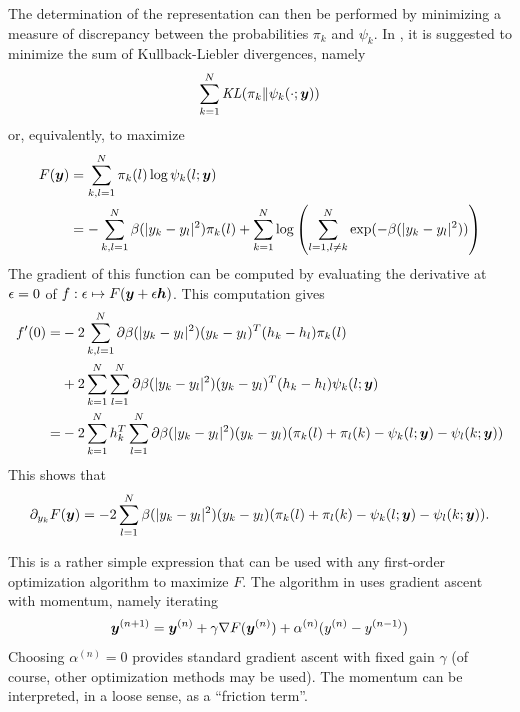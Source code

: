 
The determination of the representation can then be performed by minimizing a measure of discrepancy between the probabilities $\pi_k$ and $\psi_k$. In \citet{hinton2002stochastic}, it is suggested to minimize the sum of Kullback-Liebler divergences, namely
\[
\sum_{k=1}^N \mathit{KL}(\pi_k\|\psi_k(\cdot;{\bm{y}})) 
\]
or, equivalently, to maximize
\begin{align*}
F({\bm{y}}) &= \sum_{k,l=1}^N \pi_k(l) \log \psi_k(l ; {\bm{y}}) \\
&= - \sum_{k,l=1}^N \beta(|y_k-y_l|^2) \pi_k(l) + \sum_{k=1}^N \log \left(\sum_{l=1, l\neq k}^N \exp(-\beta(|y_k-y_l|^2))\right)
\end{align*}
The gradient of this function can be computed by evaluating the derivative at $\epsilon=0$ of $f: \epsilon \mapsto F( {\bm{y}}+\epsilon {\bm{h}})$. This computation gives
\begin{align*}
f'(0) =& -2 \sum_{k,l=1}^N \partial\beta(|y_k-y_l|^2) (y_k-y_l)^T(h_k-h_l) \pi_k(l) \\
&+ 2\sum_{k=1}^N \sum_{l=1}^N \partial \beta(|y_k-y_l|^2) (y_k-y_l)^T(h_k-h_l)\psi_k(l;{\bm{y}})\\
 =& - 2 \sum_{k=1}^N h^T_k \sum_{l=1}^N \partial\beta(|y_k-y_l|^2)(y_k - y_l) (\pi_k(l) + \pi_l(k) - \psi_k(l;{\bm{y}}) - \psi_l(k;{\bm{y}}))
\end{align*}
This shows that
\[
\partial_{y_k} F({\bm{y}}) = -2  \sum_{l=1}^N \beta(|y_k-y_l|^2)(y_k - y_l) (\pi_k(l) + \pi_l(k) - \psi_k(l;{\bm{y}}) - \psi_l(k;{\bm{y}})).
\]

This is a rather simple expression that can be used with any first-order optimization algorithm to maximize $F$. The algorithm in
\citet{hinton2002stochastic} uses gradient ascent with momentum, namely iterating 
\[
{\bm{y}}^{(n+1)} = {\bm{y}}^{(n)} + \gamma \nabla F({\bm{y}}^{(n)}) + \alpha^{(n)} (y^{(n)} - y^{(n-1)})
\]
Choosing $\alpha^{(n)} = 0$ provides standard gradient ascent with fixed gain $\gamma$ (of course,  other optimization methods may be used). The momentum can be interpreted, in a loose sense, as a ``friction term''.

